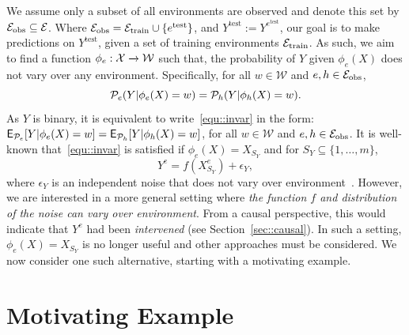 \documentclass[conference,letterpaper]{IEEEtran}
\begin{document}
We assume only a subset of all environments are observed and denote this set by $\mathcal{E}_{\text{obs}}\subseteq\mathcal{E}$. Where $\mathcal{E}_{\text{obs}} = \mathcal{E}_{\text{train}}\cup\{e^{\text{test}}\}$, and $Y^{\text{test}}:=Y^{e^{\text{test}}}$, our goal is to make predictions on $Y^{\text{test}}$, given a set of training environments $\mathcal{E}_{\text{train}}$.
 As such, we aim to find a function $\phi_e:\mathcal{X}\xrightarrow{}\mathcal{W}$ such that, the probability of $Y$ given $\phi_e(X)$ does not vary over any environment. Specifically, for all $w\in\mathcal{W}$ and $e,h\in\mathcal{E}_{\text{obs}}$,
\begin{equation}\label{equ::invar}
    \Pc_e(Y|\phi_e(X)=w) = \Pc_h(Y|\phi_h(X)=w).
\end{equation}
As $Y$ is binary, it is equivalent to write~\eqref{equ::invar} in the form: $\operatorname{\sf E}_{\mathcal{P}_e}[Y|\phi_e(X)=w] = \operatorname{\sf E}_{\mathcal{P}_h}[Y|\phi_h(X)=w]$,  for all  $w\in\mathcal{W}$ and $e,h\in\mathcal{E}_{\text{obs}}$. It is well-known that~\eqref{equ::invar} is satisfied if $\phi_e(X) = X_{S_Y}$ and for $S_Y\subseteq\{1,\dots,m\}$,
\begin{equation}\label{equ::parentY}
    Y^e = f(X_{S_Y}^e) + \epsilon_Y,
\end{equation} 
where $\epsilon_Y$ is an independent noise that does not vary over environment~\cite{peters2016causal}. However, we are interested in a more general setting where \emph{the function $f$ and distribution of the noise can vary over environment}. From a causal perspective, this would indicate that $Y^e$ had been \emph{intervened} (see Section~\ref{sec::causal}). In such a setting, $\phi_e(X) = X_{S_Y}$ is no longer useful and other approaches must be considered. We now consider one such alternative, starting with a motivating example. 

\section{Motivating Example}
\end{document}
